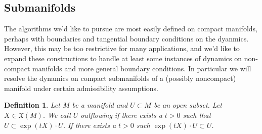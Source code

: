 \documentclass[12pt]{amsart}
\newtheorem{defn}{Definition}
\begin{document}
\subsection{Submanifolds}
The algorithms we'd like to pursue are most easily defined on
compact manifolds, perhaps with boundaries and tangential boundary
conditions on the dyanmics.
However, this may be too restrictive for many applications, and
we'd like to expand these constructions to handle at least
some instances of dynamics on non-compact
manifolds and more general boundary conditions.
In particular we will resolve the dynamics on compact
submanifolds of a (possibly noncompact) manifold under certain
admissibility assumptions.

\begin{defn}
  Let $M$ be a manifold and $U \subset M$ be an open subset.
  Let $X \in \mathfrak{X}(M)$.
  We call $U$ \emph{outflowing} if there exists a $t > 0$
  such that $U \subset \exp(t X) \cdot U$.
  If there exists a $t>0$ such $\exp(t X) \cdot U \subset U$.
\end{defn}
\end{document}
